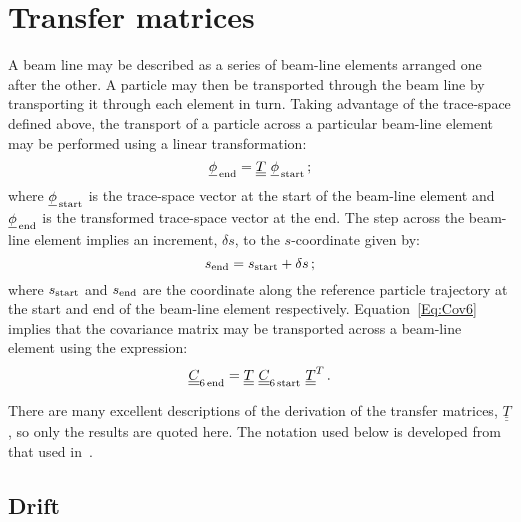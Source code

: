 \graphicspath{ {04-TransferMatrices/Figures/} }

\section{Transfer matrices}

A beam line may be described as a series of beam-line elements
arranged one after the other.
A particle may then be transported through the beam line by
transporting it through each element in turn.
Taking advantage of the trace-space defined above, the transport of
a particle across a particular beam-line element may be performed
using a linear transformation:
\begin{equation}
  \underline{\phi}_{\rm\,end} = \underline{\underline{T}} ~
                            \underline{\phi}_{\rm\,start} \, ;
\end{equation}
where $\underline{\phi}_{\rm\,start}$ is the trace-space vector at the
start of the beam-line element and $\underline{\phi}_{\rm\,end}$ is
the transformed trace-space vector at the end.
The step across the beam-line element implies an increment, $\delta s$,
to the $s$-coordinate given by:
\begin{equation}
  s_{\rm end} = s_{\rm start} + \delta s \, ;
\end{equation}
where $s_{\rm start}$ and $s_{\rm end}$ are the coordinate along the
reference particle trajectory at the start and end of the beam-line
element respectively.
Equation~\ref{Eq:Cov6} implies that the covariance matrix may be
transported across a beam-line element using the expression:
\begin{equation}
  \underline{\underline{C}}_{6\,\rm end} =
     \underline{\underline{T}}~
       \underline{\underline{C}}_{6\,\rm start}~
     \underline{\underline{T}}^T \, .
\end{equation}

There are many excellent descriptions of the derivation of the
transfer matrices, $\underline{\underline{T}}$, so only the results
are quoted here.
The notation used below is developed from that used
in~\cite{Wolski:2014}.

\subsection{Drift}

